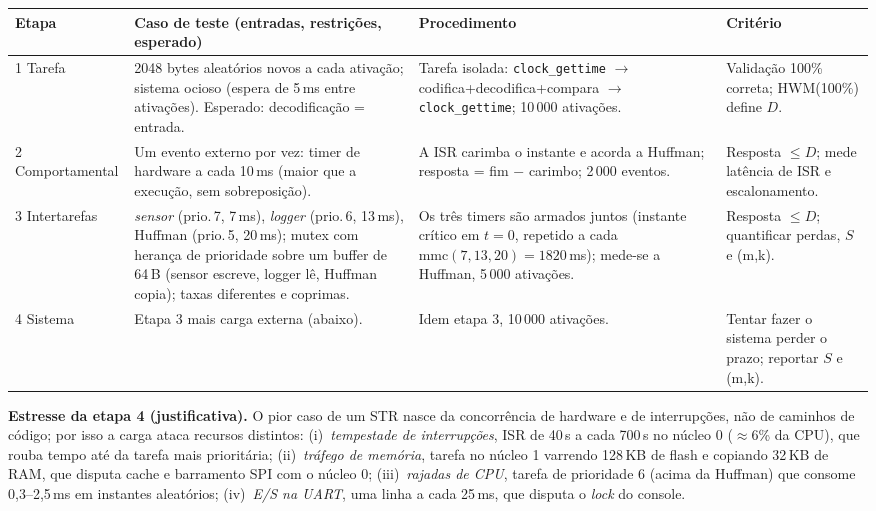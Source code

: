 \documentclass[11pt,a4paper]{article}
\begin{document}
\begin{table}[H]\centering\footnotesize
\begin{tabularx}{\linewidth}{@{}p{1.65cm}XXX@{}}
\toprule
\textbf{Etapa} & \textbf{Caso de teste (entradas, restrições, esperado)} & \textbf{Procedimento} & \textbf{Critério}\\\midrule
1 Tarefa & 2048 bytes aleatórios novos a cada ativação; sistema ocioso (espera de 5\,ms entre ativações). Esperado: decodificação = entrada. & Tarefa isolada: \texttt{clock\_gettime} $\to$ codifica+decodifica+compara $\to$ \texttt{clock\_gettime}; 10\,000 ativações. & Validação 100\% correta; HWM(100\%) define $D$.\\
2 Compor\-tamental & Um evento externo por vez: timer de hardware a cada 10\,ms (maior que a execução, sem sobreposição). & A ISR carimba o instante e acorda a Huffman; resposta = fim $-$ carimbo; 2\,000 eventos. & Resposta $\le D$; mede latência de ISR e escalonamento.\\
3 Inter\-tarefas & \emph{sensor} (prio.\,7, 7\,ms), \emph{logger} (prio.\,6, 13\,ms), Huffman (prio.\,5, 20\,ms); mutex com herança de prioridade sobre um buffer de 64\,B (sensor escreve, logger lê, Huffman copia); taxas diferentes e coprimas. & Os três timers são armados juntos (instante crítico em $t=0$, repetido a cada $\mathrm{mmc}(7,13,20)=1820$\,ms); mede-se a Huffman, 5\,000 ativações. & Resposta $\le D$; quantificar perdas, $S$ e (m,k).\\
4 Sistema & Etapa 3 mais carga externa (abaixo). & Idem etapa 3, 10\,000 ativações. & Tentar fazer o sistema perder o prazo; reportar $S$ e (m,k).\\\bottomrule
\end{tabularx}
\end{table}
\textbf{Estresse da etapa 4 (justificativa).} O pior caso de um STR nasce da concorrência de hardware e de interrupções, não de caminhos de código; por isso a carga ataca recursos distintos: (i)~\emph{tempestade de interrupções}, ISR de 40\,\textmu s a cada 700\,\textmu s no núcleo 0 ($\approx$6\% da CPU), que rouba tempo até da tarefa mais prioritária; (ii)~\emph{tráfego de memória}, tarefa no núcleo 1 varrendo 128\,KB de flash e copiando 32\,KB de RAM, que disputa cache e barramento SPI com o núcleo 0; (iii)~\emph{rajadas de CPU}, tarefa de prioridade 6 (acima da Huffman) que consome 0,3--2,5\,ms em instantes aleatórios; (iv)~\emph{E/S na UART}, uma linha a cada 25\,ms, que disputa o \emph{lock} do console.
\end{document}
